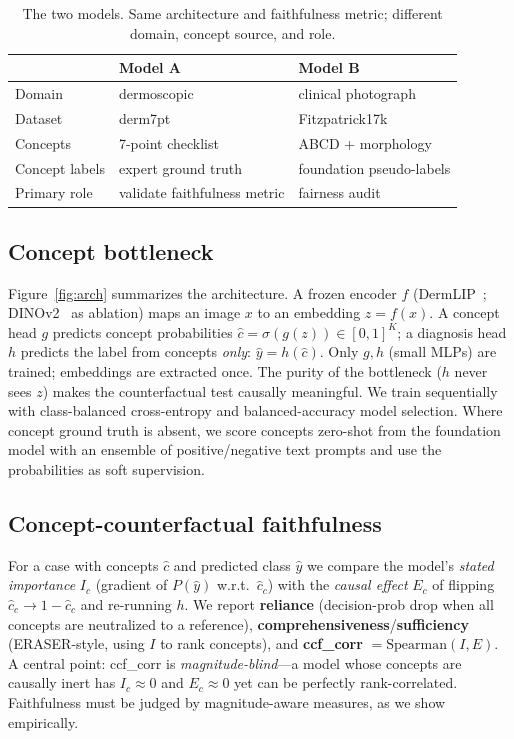 \documentclass{svproc}
\begin{document}
\begin{table}[h]
\caption{The two models. Same architecture and faithfulness metric; different domain,
concept source, and role.}
\label{tab:models}
\begin{center}
\begin{tabular}{lll}
\hline\rule{0pt}{12pt}
 & \textbf{Model A} & \textbf{Model B}\\[2pt]
\hline\rule{0pt}{12pt}
Domain & dermoscopic & clinical photograph\\
Dataset & derm7pt & Fitzpatrick17k\\
Concepts & 7-point checklist & ABCD + morphology\\
Concept labels & expert ground truth & foundation pseudo-labels\\
Primary role & validate faithfulness metric & fairness audit\\[2pt]
\hline
\end{tabular}
\end{center}
\end{table}

\subsection{Concept bottleneck}
Figure~\ref{fig:arch} summarizes the architecture. A frozen encoder $f$
(DermLIP~\cite{dermlip2025}; DINOv2~\cite{oquab2024} as ablation)
maps an image $x$ to an embedding $z=f(x)$. A concept head $g$ predicts concept
probabilities $\hat c=\sigma(g(z))\in[0,1]^K$; a diagnosis head $h$ predicts the label
from concepts \emph{only}: $\hat y = h(\hat c)$. Only $g,h$ (small MLPs) are trained;
embeddings are extracted once. The purity of the bottleneck ($h$ never sees $z$) makes
the counterfactual test causally meaningful. We train sequentially with class-balanced
cross-entropy and balanced-accuracy model selection. Where concept ground truth is
absent, we score concepts zero-shot from the foundation model with an ensemble of
positive/negative text prompts and use the probabilities as soft supervision.

\subsection{Concept-counterfactual faithfulness}
For a case with concepts $\hat c$ and predicted class $\hat y$ we compare the model's
\emph{stated importance} $I_c$ (gradient of $P(\hat y)$ w.r.t.\ $\hat c_c$) with the
\emph{causal effect} $E_c$ of flipping $\hat c_c\!\to\!1-\hat c_c$ and re-running $h$.
We report \textbf{reliance} (decision-prob drop when all concepts are neutralized to a
reference), \textbf{comprehensiveness}/\textbf{sufficiency} (ERASER-style, using $I$ to
rank concepts), and \textbf{ccf\_corr} $=\mathrm{Spearman}(I,E)$. A central point:
ccf\_corr is \emph{magnitude-blind}---a model whose concepts are causally inert has
$I_c\!\approx\!0$ and $E_c\!\approx\!0$ yet can be perfectly rank-correlated.
Faithfulness must be judged by magnitude-aware measures, as we show empirically.
\end{document}
